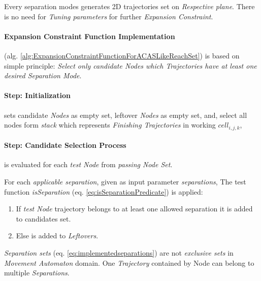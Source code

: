 \begin{note}
    Every separation modes generates 2D trajectories set on \emph{Respective plane}. There is no need for \emph{Tuning parameters} for further \emph{Expansion Constraint}.    
\end{note}

\paragraph{Expansion Constraint Function Implementation} (alg. \ref{alg:ExpansionConstraintFunctionForACASLikeReachSet}) is based on simple principle:
\emph{Select only candidate Nodes which Trajectories have at least one desired Separation Mode}.

\paragraph{Step: Initialization} sets candidate \emph{Nodes} as empty set,  leftover \emph{Nodes} as empty set, and, select all nodes form \emph{stack} which represents \emph{Finishing Trajectories} in working $cell_{i,j,k}$,

\paragraph{Step: Candidate Selection Process} is evaluated for each \emph{test Node} from \emph{passing Node Set}. 

For each \emph{applicable separation}, given as input parameter \emph{separations}, The test function \emph{isSeparation} (eq. \ref{eq:isSeparationPredicate}) is applied:
\begin{enumerate}
    \item If \emph{test Node} trajectory belongs to at least one allowed separation it is added to candidates set.
    \item Else is added to \emph{Leftovers}.
\end{enumerate}

\begin{note}
    \emph{Separation sets} (eq. \ref{eq:implementedseparations}) are not \emph{exclusive sets} in \emph{Movement Automaton} domain. One \emph{Trajectory} contained by Node can belong to multiple \emph{Separations}.    
\end{note}

